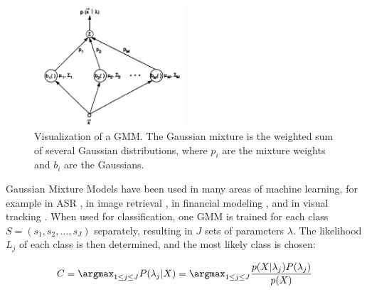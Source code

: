     \begin{figure}
        \begin{center}
            \includegraphics[width=0.5\textwidth]{figures/gmm_structure.png}
            \caption{Visualization of a GMM. The Gaussian mixture is the weighted sum of several Gaussian distributions, where $p_i$ are the mixture weights and $b_i$ are the Gaussians. \cite{reynolds_rose}}
            \label{fig:gmm_structure}
        \end{center}
    \end{figure}


    Gaussian Mixture Models have been used in many areas of machine learning, for example in ASR \cite{reynolds_rose}, in image retrieval \cite{permuter}, in financial modeling \cite{alexander}, and in visual tracking \cite{chen_adebomi}. 
    When used for classification, one GMM is trained for each class $S = (s_1, s_2, ..., s_J)$ separately, resulting in $J$ sets of parameters $\lambda$. 
    The likelihood $L_j$ of each class is then determined, and the most likely class is chosen:

    \begin{equation}
        C = \argmax_{1 \leq j \leq J } P(\lambda_j | X) = \argmax_{1 \leq j \leq J} \frac{p(X | \lambda_j) P(\lambda_j)}{p(X)}
    \end{equation}

